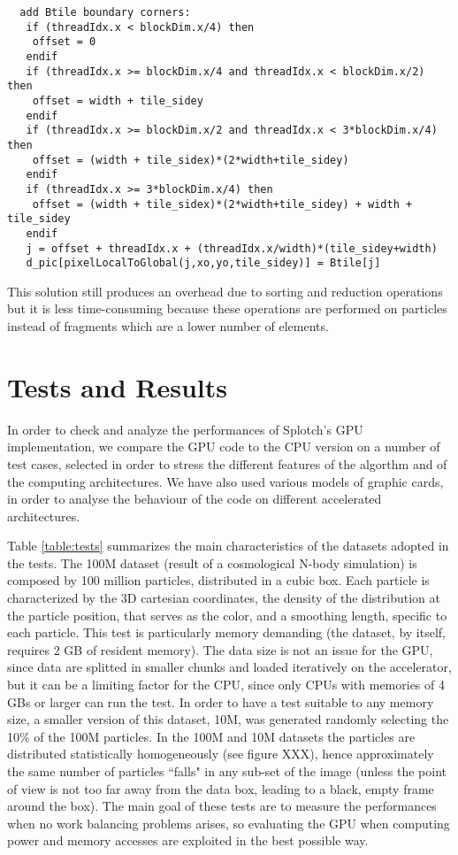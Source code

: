 \documentclass[11pt]{article}
\begin{document}
\begin{verbatim}
  add Btile boundary corners:
   if (threadIdx.x < blockDim.x/4) then
    offset = 0
   endif
   if (threadIdx.x >= blockDim.x/4 and threadIdx.x < blockDim.x/2) then
    offset = width + tile_sidey
   endif
   if (threadIdx.x >= blockDim.x/2 and threadIdx.x < 3*blockDim.x/4) then
    offset = (width + tile_sidex)*(2*width+tile_sidey)
   endif
   if (threadIdx.x >= 3*blockDim.x/4) then
    offset = (width + tile_sidex)*(2*width+tile_sidey) + width + tile_sidey
   endif
   j = offset + threadIdx.x + (threadIdx.x/width)*(tile_sidey+width)
   d_pic[pixelLocalToGlobal(j,xo,yo,tile_sidey)] = Btile[j]

\end{verbatim}
\normalsize
This solution still produces an overhead due to sorting and reduction operations but it is less time-consuming because these operations are performed on particles instead of fragments which are a lower number of elements.   

\section{Tests and Results}

In order to check and analyze the performances of Splotch's GPU implementation,
we compare the GPU code to the CPU version on a number of test cases, selected in 
order to stress the different features of the algorthm and of the computing 
architectures. We have also used various models of graphic cards, in order to analyse
the behaviour of the code on different accelerated architectures.

Table \ref{table:tests} summarizes the main characteristics of the datasets adopted in the 
tests. The 100M dataset (result of a cosmological N-body simulation) 
is composed by 100 million particles, distributed in 
a cubic box. Each particle is characterized by the 3D cartesian coordinates,
the density of the distribution at the particle position, that serves as the color,
and a smoothing length, specific to each particle. This test is particularly 
memory demanding (the dataset, by itself, requires 2 GB 
of resident memory). The data size is not an issue for the GPU, since data are splitted 
in smaller chunks and loaded iteratively on the accelerator, but it can be a limiting factor
for the CPU, since only CPUs with memories of 4 GBs or larger can run the test. 
In order to have a test suitable to any memory size, a smaller version of this dataset, 10M, was generated 
randomly selecting the 10\% of the 100M particles. 
In the 100M and 10M datasets the particles are distributed 
statistically homogeneously (see figure XXX), hence approximately the same 
number of particles ``falls" in any sub-set of the image (unless
the point of view is not too far away from the data box, leading to a black, empty 
frame around the box). The main goal of these tests are to measure the performances
when no work balancing problems arises, so evaluating the GPU when computing 
power and memory accesses are exploited in the best possible way. 
\end{document}
